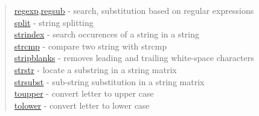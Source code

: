 \begin{quote}
\hyperlink{regexp}{regexp},\hyperlink{regsub}{regsub} - search,
substitution based on regular expressions\\
\hyperlink{split}{split} - string splitting\\
\hyperlink{strindex}{strindex} - search occurences of a string in a string\\
\hyperlink{strcmp}{strcmp} - compare two string with strcmp \\
\hyperlink{stripblanks}{stripblanks} - removes leading and trailing white-space characters\\
\hyperlink{strstr}{strstr} - locate a substring in a string matrix\\
\hyperlink{strsubst}{strsubst} - sub-string substitution in a string matrix\\
\hyperlink{toupper}{toupper} - convert letter to upper case\\
\hyperlink{tolower}{tolower} - convert letter to lower case\\
\end{quote}





















